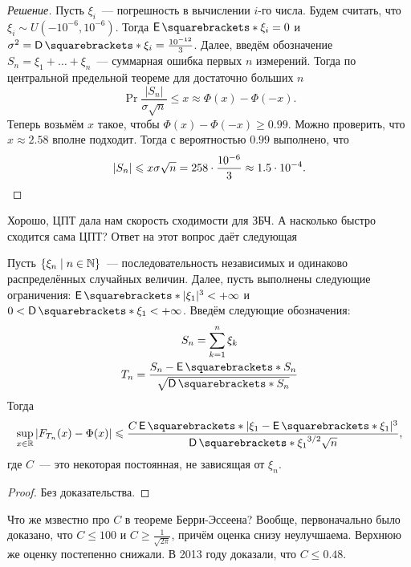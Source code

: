 \begin{proof}[Решение]
	Пусть \(\xi_{i}\)~--- погрешность в вычислении \(i\)-го числа. Будем считать, что \(\xi_{i} \sim U(-10^{-6}, 10^{-6})\). Тогда \(\E{\xi_{i}} = 0\) и \(\sigma^2 = \D{\xi_{i}} = \frac{10^{-12}}{3}\). Далее, введём обозначение \(S_n = \xi_{1} + \dots + \xi_{n}\)~--- суммарная ошибка первых \(n\) измерений. Тогда по центральной предельной теореме для достаточно больших \(n\)
	\[
		\Pr{\frac{|S_n|}{\sigma\sqrt{n}} \leq x} \approx \Phi(x) - \Phi(-x).
	\]
	Теперь возьмём \(x\) такое, чтобы \(\Phi(x) - \Phi(-x) \geq 0.99\). Можно проверить, что \(x \approx 2.58\) вполне подходит. Тогда с вероятностью \(0.99\) выполнено, что
	\[
		|S_n| \leq x\sigma\sqrt{n} = 258 \cdot \frac{10^{-6}}{3} \approx 1.5 \cdot 10^{-4}.\qedhere
	\]
\end{proof}

Хорошо, ЦПТ дала нам скорость сходимости для ЗБЧ. А насколько быстро сходится сама ЦПТ? Ответ на этот вопрос даёт следующая 
\begin{theorem}
	Пусть \(\{\xi_{n} \mid n \in \N\}\)~--- последовательность независимых и одинаково распределённых случайных величин. Далее, пусть выполнены следующие ограничения: \(\E{|\xi_1|^3} < +\infty\) и \(0 < \D{\xi_1} < +\infty\). Введём следующие обозначения:
	\begin{gather*}
		S_n = \sum_{k = 1}^{n} \xi_{k} \\
		T_n = \frac{S_n - \E{S_n}}{\sqrt{\D{S_n}}}
	\end{gather*}
	Тогда
	\[
		\sup_{x \in \R} \left|F_{T_n}(x) - \Phi(x)\right| \leq 
		\frac{C\E{|\xi_1 - \E{\xi_1}|^3}}{\D{\xi_{1}}^{3/2}\sqrt{n}},
	\]
	где \(C\)~--- это некоторая постоянная, не зависящая от \(\xi_{n}\).
\end{theorem}
\begin{proof}
	Без доказательства.
\end{proof}
Что же мзвестно про \(C\) в теореме Берри-Эссеена? Вообще, первоначально было доказано, что \(C \leq 100\) и \(C \geq \frac{1}{\sqrt{2\pi}}\), причём оценка снизу неулучшаема. Верхнюю же оценку постепенно снижали. В 2013 году доказали, что \(C \leq 0.48\).

